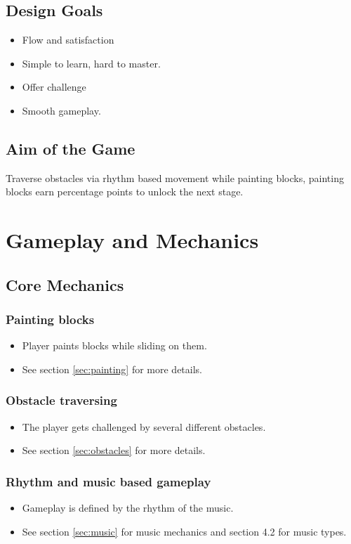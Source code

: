 \documentclass[11pt,a4paper]{report}
\begin{document}
\section{Design Goals}
\begin{itemize}
  \item Flow and satisfaction
  \item Simple to learn, hard to master.
  \item Offer challenge
  \item Smooth gameplay.
\end{itemize}

\section{Aim of the Game}
Traverse obstacles via rhythm based movement while painting blocks, painting blocks earn percentage points to unlock the next stage.

\chapter{Gameplay and Mechanics}
\section{Core Mechanics}
\subsection{Painting blocks}
\begin{itemize}
  \item Player paints blocks while sliding on them.
  \item See section \ref{sec:painting} for more details.
\end{itemize}

\subsection{Obstacle traversing}
\begin{itemize}
  \item The player gets challenged by several different obstacles.
  \item See section \ref{sec:obstacles} for more details.
\end{itemize}

\subsection{Rhythm and music based gameplay}
\begin{itemize}
  \item Gameplay is defined by the rhythm of the music.
  \item See section \ref{sec:music} for music mechanics and section 4.2 for music types.
\end{itemize}
\end{document}
